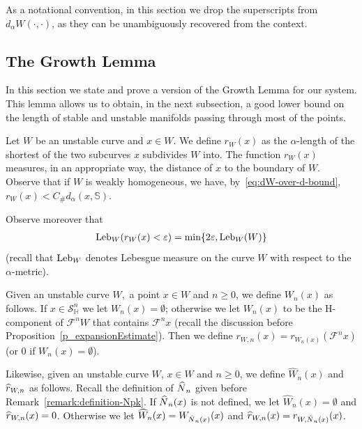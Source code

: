 \documentclass[10pt]{amsart}
\theoremstyle{definition}\newtheorem{defi}[theo]{Definition}\newtheorem{rema}[theo]{Remark}\newtheorem{exam}[theo]{Example}\newtheorem{exem}[theo]{Example}\newtheorem{nota}[theo]{Notation}
\newcommand{\eps}{\varepsilon}
\newcommand{\const}{C_\#}
\newcommand{\hhs}{\mathbb{S}}
\newcommand{\homo}{\mathbb{H}}
\newcommand{\cm}{\mathcal{F}}
\newcommand{\dadm}[1]{\dadmPrivate^{#1}}
\newcommand{\dadmPrivate}{d\adm}
\newcommand{\singPrivate}{\mathcal{S}}
\newcommand{\hsing}[1]{{\singPrivate}_\homo^{#1}}
\newcommand{\adm}{_{\alpha^{+}}}
\newcommand{\admName}{\alpha^{+}}
\newcommand{\Np}{\hat N}
\newcommand{\Leb}{\textup{Leb}}
\renewcommand{\admName}{\alpha}
\renewcommand{\adm}{_{\alpha}}
\renewcommand{\dadm}{d\adm}
\let\oldhat\hat
\renewcommand*{\hat}[1]{\mathchoice{\widehat{#1}}{\widehat{#1}}{\oldhat{#1}}{\oldhat{#1}}}
\begin{document}
As a notational convention, in this section we drop the superscripts from $\dadm{W}(\cdot,\cdot)$, as they can be unambiguously recovered from the context.


\subsection{The Growth Lemma}\label{sec:growth-lemma}
In this section we state and prove a version of the Growth Lemma for our system. This lemma allows us to obtain, in the next subsection, a good lower bound on the length of stable and unstable manifolds passing through most of the points.

Let $W$ be an unstable curve and $x\in W$. We define $r_W(x)$ as the $\admName$-length of the shortest of the two subcurves $x$ subdivides $W$ into. The function $r_{W}(x)$ measures, in an appropriate way, the distance of $x$ to the boundary of $W$. Observe that if $W$ is weakly homogeneous, we have, by~\eqref{eq:dW-over-d-bound},\; $r_{W}(x) < \const \dadm(x,\hhs)$.

Observe moreover that
\begin{align}\label{eq:trivial-bound-for-r}
\Leb_{W}(r_{W}(x) < \eps) = \min\{2\eps,\Leb_{W}(W)\}
\end{align}
(recall that $\Leb_{W}$ denotes Lebesgue measure on the curve $W$ with respect to the $\admName$-metric).

Given an unstable curve $W,$ a point $x\in W$ and $n\ge 0$, we define $W_{n}(x)$ as follows. If $x\in\hsing n$ we let $W_{n}(x) = \emptyset$; otherwise we let $W_{n}(x)$ to be the H-component of $\cm^{n} W$ that contains $\cm^{n} x$ (recall the discussion before Proposition~\ref{p_expansionEstimate}). Then we define $r_{W,n}(x) = r_{W_{n}(x)}(\cm^{n}x)$ (or $0$ if $W_{n}(x) = \emptyset$).

Likewise, given an unstable curve $W$, $x\in W$ and $n\ge 0$, we define $\widehat{W}_{n}(x)$ and $\hat r_{W,n}$ as follows. Recall the definition of $\Np_{n}$ given before Remark~\ref{remark:definition-Npk}. If $\Np_{n}(x)$ is not defined, we let $\widehat{W}_{n}(x) = \emptyset$ and $\hat r_{W,n}(x) = 0$. Otherwise we let $\widehat{W}_{n}(x) = W_{\Np_{n}(x)}(x)$ and $\hat r_{W,n}(x) = r_{W,\Np_{n}(x)}(x)$.
\end{document}

